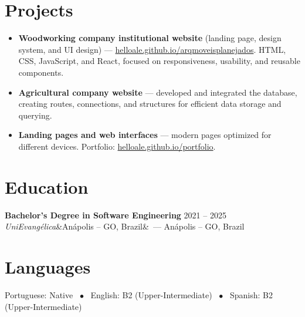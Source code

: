 \documentclass[10.5pt,a4paper]{article}
\newcommand{\entry}[4]{%
  \textbf{#1} \hfill #4\\
  \textit{#2}\ifx&#3&\else\ --- #3\fi\par\vspace{1pt}}
\begin{document}
\section{Projects}
\begin{itemize}
  \item \textbf{Woodworking company institutional website} (landing page, design system, and UI design) --- \href{https://helloale.github.io/arqmoveisplanejados/}{helloale.github.io/arqmoveisplanejados}. HTML, CSS, JavaScript, and React, focused on responsiveness, usability, and reusable components.
  \item \textbf{Agricultural company website} --- developed and integrated the database, creating routes, connections, and structures for efficient data storage and querying.
  \item \textbf{Landing pages and web interfaces} --- modern pages optimized for different devices. Portfolio: \href{https://helloale.github.io/portfolio}{helloale.github.io/portfolio}.
\end{itemize}

\section{Education}
\entry{Bachelor's Degree in Software Engineering}{UniEvangélica}{Anápolis -- GO, Brazil}{2021 -- 2025}

\section{Languages}
Portuguese: Native \ $\bullet$ \ English: B2 (Upper-Intermediate) \ $\bullet$ \ Spanish: B2 (Upper-Intermediate)
\end{document}
